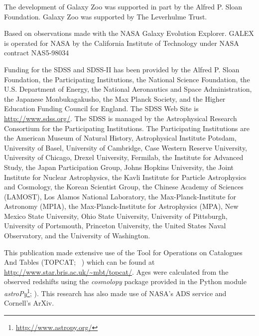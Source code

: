 \documentclass[useAMS,usenatbib]{mn2e}
\begin{document}
The development of Galaxy Zoo was supported in part by the Alfred P. Sloan Foundation. Galaxy Zoo was supported by The Leverhulme Trust. 

Based on observations made with the NASA Galaxy Evolution Explorer.  GALEX is operated for NASA by the California Institute of Technology under NASA contract NAS5-98034

Funding for the SDSS and SDSS-II has been provided by the Alfred P. Sloan Foundation, the Participating Institutions, the National Science Foundation, the U.S. Department of Energy, the National Aeronautics and Space Administration, the Japanese Monbukagakusho, the Max Planck Society, and the Higher Education Funding Council for England. The SDSS Web Site is \url{http://www.sdss.org/}.
The SDSS is managed by the Astrophysical Research Consortium for the Participating Institutions. The Participating Institutions are the American Museum of Natural History, Astrophysical Institute Potsdam, University of Basel, University of Cambridge, Case Western Reserve University, University of Chicago, Drexel University, Fermilab, the Institute for Advanced Study, the Japan Participation Group, Johns Hopkins University, the Joint Institute for Nuclear Astrophysics, the Kavli Institute for Particle Astrophysics and Cosmology, the Korean Scientist Group, the Chinese Academy of Sciences (LAMOST), Los Alamos National Laboratory, the Max-Planck-Institute for Astronomy (MPIA), the Max-Planck-Institute for Astrophysics (MPA), New Mexico State University, Ohio State University, University of Pittsburgh, University of Portsmouth, Princeton University, the United States Naval Observatory, and the University of Washington.

This publication made extensive use of the Tool for Operations on Catalogues And Tables (TOPCAT; ~\citealt{Taylor05}) which can be found at \url{http://www.star.bris.ac.uk/~mbt/topcat/}. Ages were calculated from the observed redshifts using the \emph{cosmolopy} package provided in the Python module \emph{astroPy}\footnote{\url{http://www.astropy.org/}}; \citealt{Rob13}). This research has also made use of NASA's ADS service and Cornell's ArXiv. 
\end{document}

